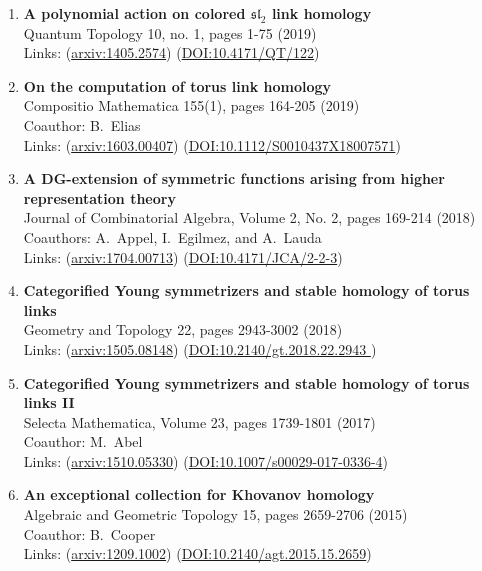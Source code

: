 \documentclass[12pt]{amsart}
\renewcommand{\sl}{\mathfrak{sl}}
\begin{document}
\begin{enumerate}
\item {\bf A polynomial action on colored $\sl_2$ link homology}\\
Quantum Topology 10, no. 1, pages 1-75  (2019)\\
Links: (\href{http://arxiv.org/abs/1405.2574}{arxiv:1405.2574}) (\href{https://doi.org/10.4171/QT/122}{DOI:10.4171/QT/122})


\item {\bf On the computation of torus link homology}\\
Compositio Mathematica 155(1), pages 164-205  (2019)\\
Coauthor: B.~Elias\\
Links: (\href{http://arxiv.org/abs/1603.00407}{arxiv:1603.00407}) (\href{https://doi.org/10.1112/S0010437X18007571}{DOI:10.1112/S0010437X18007571})


\item {\bf A DG-extension of symmetric functions arising from higher representation theory}\\
Journal of Combinatorial Algebra, Volume 2, No. 2, pages 169-214 (2018)\\
Coauthors:  A.~Appel, I.~Egilmez, and A.~Lauda\\
Links: (\href{http://arxiv.org/abs/1704.00713}{arxiv:1704.00713}) (\href{https://doi.org/10.4171/JCA/2-2-3}{DOI:10.4171/JCA/2-2-3})


\item {\bf Categorified Young symmetrizers and stable homology of torus links}\\
Geometry and Topology 22, pages 2943-3002 (2018)\\
Links: (\href{http://arxiv.org/abs/1505.08148}{arxiv:1505.08148}) (\href{https://doi.org/10.2140/gt.2018.22.2943}{DOI:10.2140/gt.2018.22.2943
})

\item {\bf Categorified Young symmetrizers and stable homology of torus links II}\\
Selecta Mathematica, Volume 23, pages 1739-1801 (2017)\\
Coauthor: M.~Abel\\
Links: (\href{http://arxiv.org/abs/1510.05330}{arxiv:1510.05330})  (\href{https://doi.org/10.1007/s00029-017-0336-4}{DOI:10.1007/s00029-017-0336-4})


\item {\bf An exceptional collection for Khovanov homology}\\
Algebraic and Geometric Topology 15, pages 2659-2706 (2015)\\
Coauthor: B.\ Cooper\\
Links: (\href{http://arxiv.org/abs/1209.1002}{arxiv:1209.1002}) (\href{https://doi.org/10.2140/agt.2015.15.2659}{DOI:10.2140/agt.2015.15.2659})



\end{enumerate}
\end{document}
